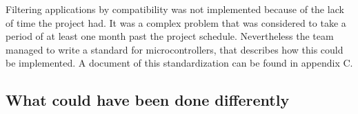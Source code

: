 			Filtering applications by compatibility was not implemented because of the lack of time the project had. It was a complex problem that was considered to take a period of at least one month past the project schedule. Nevertheless the team managed to write a standard for microcontrollers, that describes how this could be implemented. A document of this standardization can be found in appendix C. \\

		\subsection{What could have been done differently}

